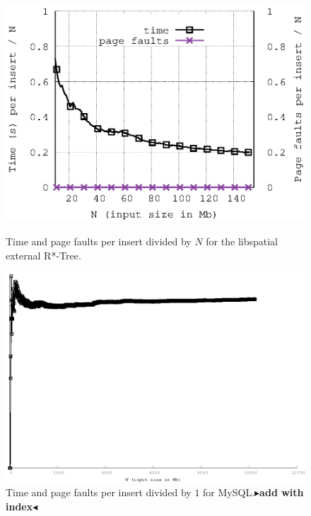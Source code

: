\documentclass[twoside,11pt,openright]{report}
\newcommand{\todo}[1]{{\color[rgb]{.5,0,0}\textbf{$\blacktriangleright$#1$\blacktriangleleft$}}}
\begin{document}
\begin{figure}
\begin{minipage}{0.48\columnwidth}
  \centering
  \includegraphics[width=\linewidth]{../src/experiments/insert_experiment_results/2016-05-27.13_39_38/time_and_pfs}%
  \caption{Time and page faults per insert divided by $N$ for the libspatial external R*-Tree.}
  \label{fig:time_divided_with_asymptotic_libspatial}
\end{minipage}%
\hfill
\begin{minipage}{0.48\columnwidth}
  \centering
  \includegraphics[width=\linewidth]{../src/experiments/insert_experiment_results/2016-05-06.14_11_08/time_divided_with_asymptotic_mysql}%
  \caption{Time and page faults per insert divided by $1$ for MySQL.\todo{add with index}}
  \label{fig:time_divided_with_asymptotic_mysql}
\end{minipage}
\end{figure}
\end{document}
